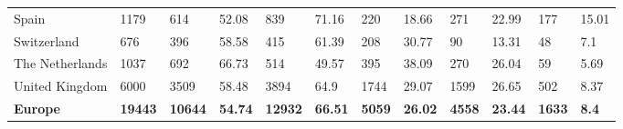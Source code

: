 \begin{tabular}{llllllllllll}
  Spain & 1179 & 614 & 52.08 & 839 & 71.16 & 220 & 18.66 & 271 & 22.99 & 177 & 15.01 \\ 
  Switzerland & 676 & 396 & 58.58 & 415 & 61.39 & 208 & 30.77 & 90 & 13.31 & 48 & 7.1 \\ 
  The Netherlands & 1037 & 692 & 66.73 & 514 & 49.57 & 395 & 38.09 & 270 & 26.04 & 59 & 5.69 \\ 
  United Kingdom & 6000 & 3509 & 58.48 & 3894 & 64.9 & 1744 & 29.07 & 1599 & 26.65 & 502 & 8.37 \\ 
  \textbf{\textbf{Europe}} & \textbf{19443} & \textbf{10644} & \textbf{54.74} & \textbf{12932} & \textbf{66.51} & \textbf{5059} & \textbf{26.02} & \textbf{4558} & \textbf{23.44} & \textbf{1633} & \textbf{8.4} \\ 
   \bottomrule
\end{tabular}

